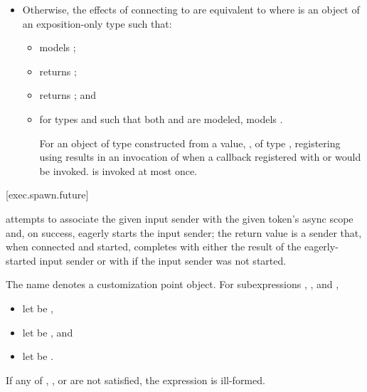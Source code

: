 \begin{itemize}
\begin{itemize}
\item
Otherwise,
the effects of connecting  to 
are equivalent to
where  is an object of
an exposition-only type  such that:
  \begin{itemize}
  \item
   models ;
  \item
   returns
  ;
  \item
   returns
  ; and
  \item
  for types  and  such that both
   and
  are modeled,
   models
  .
  \begin{tailnote}
  For an object  of type 
  constructed from a value, , of type ,
  registering  using
  results in an invocation of  when
  a callback registered with  or  would be invoked.
   is invoked at most once.
  \end{tailnote}
  \end{itemize}
\end{itemize}
\end{itemize}

[exec.spawn.future]{}

\pnum
{} attempts to associate the given input sender
with the given token's async scope and, on success,
eagerly starts the input sender;
the return value is a sender that, when connected and started,
completes with either
the result of the eagerly-started input sender or with
 if the input sender was not started.

\pnum
The name  denotes a customization point object.
For subexpressions , , and ,
\begin{itemize}
\item let  be ,
\item let  be , and
\item let  be .
\end{itemize}
If any of
,
, or
are not satisfied,
the expression  is ill-formed.

